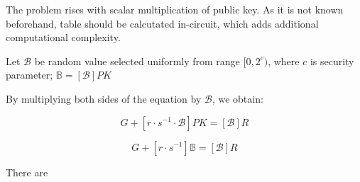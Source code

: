 \documentclass{iacrtrans}
\begin{document}
The problem rises with scalar multiplication of public key. As it is not known beforehand, table should be calcutated in-circuit, which 
adds additional computational complexity.



Let $\mathcal{B}$ be random value selected uniformly from range $[0, 2^c)$, where $c$ is security parameter; 
$\mathbb{B} = [\mathcal{B}] PK$

By multiplying both sides of the equation by $\mathcal{B}$, we obtain:

\begin{equation}
  [m \cdot s^{-1} \cdot \mathcal{B}] G + [r \cdot s^{-1} \cdot \mathcal{B}] PK = [\mathcal{B}]R
\end{equation}

\begin{equation}
  [m \cdot s^{-1} \cdot \mathcal{B}] G + [r \cdot s^{-1}] \mathbb{B} = [\mathcal{B}]R
\end{equation}

There are 



\setcounter{tocdepth}{2}
\end{document}
